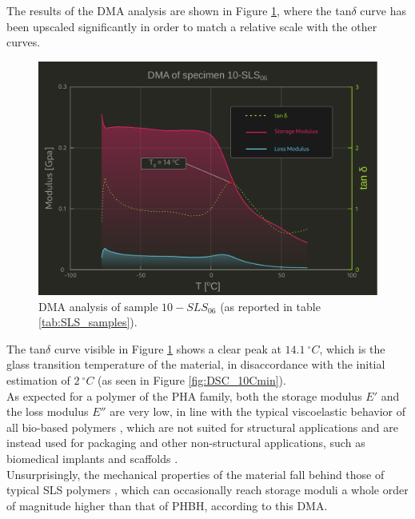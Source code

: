 \documentclass{article}
\begin{document}
        The results of the DMA analysis are shown in Figure \ref{fig:DMA_plot}, where the tan$\delta$ curve has been upscaled significantly 
        in order to match a relative scale with the other curves. \\ 

            \begin{figure}[ht]
                \centering
                \includegraphics[width=\textwidth]{Pictures/Thermal_analysis_plots/DMA.pdf}
                \caption{DMA analysis of sample $10-SLS_{06}$ (as reported in table \ref{tab:SLS_samples}).}
                \label{fig:DMA_plot}
            \end{figure}

        \clearpage 

        The tan$\delta$ curve visible in Figure \ref{fig:DMA_plot} shows a clear peak at $14.1 \ ^{\circ}C$, which is the glass transition temperature of the material, 
        in disaccordance with the initial estimation of $2 \ ^{\circ}C$ (as seen in Figure \ref{fig:DSC_10Cmin}). \\ 

        As expected for a polymer of the PHA family, both the storage modulus $E'$ and the loss modulus $E''$ are very low, in line with the 
        typical viscoelastic behavior of all bio-based polymers \autocites{Kovalcik_PHA_Review}, which are not suited for structural applications and 
        are instead used for packaging and other non-structural applications, such as biomedical implants and scaffolds \autocites{Messori_Bondioli_PHAs}. \\

        Unsurprisingly, the mechanical properties of the material fall behind those of typical SLS polymers \autocites{Padovano_SLS_Review}, which can 
        occasionally reach storage moduli a whole order of magnitude higher than that of PHBH, according to this DMA. \\ 
\end{document}
